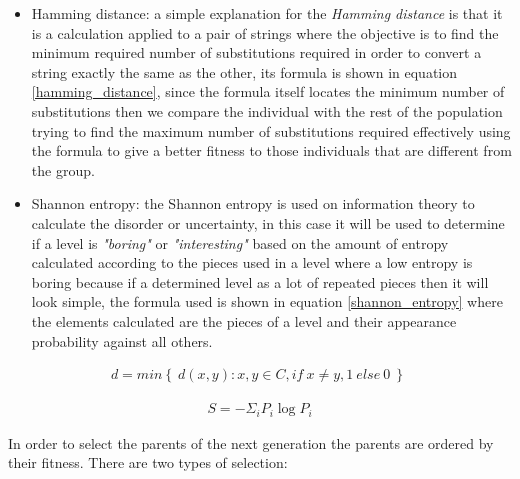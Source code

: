 \documentclass[conference]{IEEEtran}
\begin{document}
    \begin{itemize}
        \item Hamming distance: a simple explanation for the \textit{Hamming
        distance} is that it is a calculation applied to a pair of strings where the
        objective is to find the minimum required number of substitutions required in
        order to convert a string exactly the same as the other, its formula is
        shown in equation \ref{hamming_distance}, since the formula itself locates
        the minimum number of substitutions then we compare the individual
        with the rest of the population trying to find the maximum number of
        substitutions required effectively using the formula to give a better fitness
        to those individuals that are different from the group.
        \item Shannon entropy: the Shannon entropy is used on information theory to
        calculate the disorder or uncertainty, in this case it will be used to
        determine if a level is \textit{"boring"} or \textit{"interesting"} based on
        the amount of entropy calculated according to the pieces used in a level
        where a low entropy is boring because if a determined level as a lot of
        repeated pieces then it will look simple, the formula used is shown in
        equation \ref{shannon_entropy} where the elements calculated are the pieces
        of a level and their appearance probability against all others.
    \end{itemize}
    
    \begin{equation}
        \begin{aligned}
        d = min \left\{ \ d(x,y): x,y \in C, if \: x \neq y, 1 \: else \: 0 \: \right\} \
        \end{aligned}
        \label{hamming_distance}
    \end{equation}
    
    \begin{equation}
        \begin{aligned}
        S = - \Sigma_i P_i \log P_i
        \end{aligned}
        \label{shannon_entropy}
    \end{equation}

    In order to select the parents of the next generation the parents are ordered by
    their fitness. There are two types of selection:
    
\end{document}
